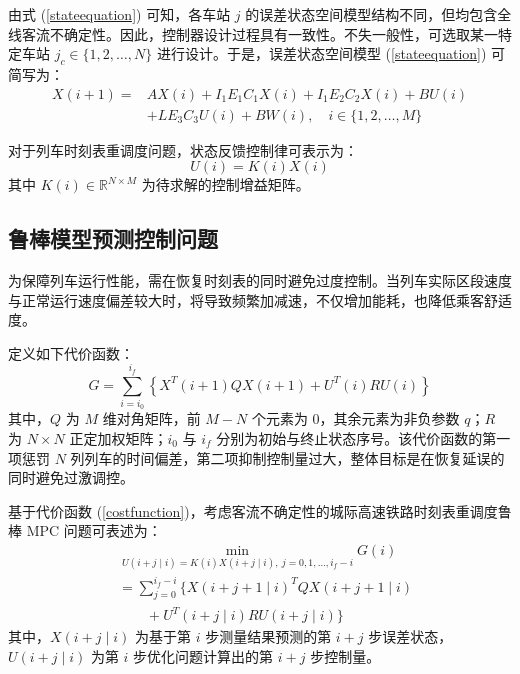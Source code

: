 由式 (\ref{stateequation}) 可知，各车站 $j$ 的误差状态空间模型结构不同，但均包含全线客流不确定性。因此，控制器设计过程具有一致性。不失一般性，可选取某一特定车站 $j_c \in \{1,2,\dots,N\}$ 进行设计。于是，误差状态空间模型 (\ref{stateequation}) 可简写为：
\begin{equation}
\label{model}
\begin{aligned}
X(i+1) ={}& A X(i) + I_{1} E_{1} C_{1} X(i) + I_{1} E_{2} C_{2} X(i) + B U(i) \\
& + L E_{3} C_{3} U(i) + B W(i), \quad i \in \{1,2, \ldots, M\}
\end{aligned}
\end{equation}

对于列车时刻表重调度问题，状态反馈控制律可表示为：
\begin{equation}
U(i) = K(i) X(i)
\end{equation}
其中 $K(i) \in \mathbb{R}^{N \times M}$ 为待求解的控制增益矩阵。

\subsection{鲁棒模型预测控制问题}
\label{2.D}

为保障列车运行性能，需在恢复时刻表的同时避免过度控制。当列车实际区段速度与正常运行速度偏差较大时，将导致频繁加减速，不仅增加能耗，也降低乘客舒适度。

定义如下代价函数：
\begin{equation}
G = \sum_{i=i_{0}}^{i_{f}} \left\{ X^{\!T}(i+1) Q X(i+1) + U^{\!T}(i) R U(i) \right\}
\end{equation}
其中，$Q$ 为 $M$ 维对角矩阵，前 $M-N$ 个元素为 0，其余元素为非负参数 $q$；$R$ 为 $N \times N$ 正定加权矩阵；$i_0$ 与 $i_f$ 分别为初始与终止状态序号。该代价函数的第一项惩罚 $N$ 列列车的时间偏差，第二项抑制控制量过大，整体目标是在恢复延误的同时避免过激调控。

基于代价函数 (\ref{costfunction})，考虑客流不确定性的城际高速铁路时刻表重调度鲁棒 MPC 问题可表述为：
\begin{equation}
	\label{costfunction}
	\begin{aligned}
		&\min_{U(i+j \mid i)=K(i) X(i+j \mid i),\ j=0,1,\dots,i_f-i} G(i) \\
		&= \sum_{j=0}^{i_f-i} \Big\{ X(i+j+1 \mid i)^{\!T} Q X(i+j+1 \mid i) \\
		&\qquad + U^{\!T}(i+j \mid i) R U(i+j \mid i) \Big\}
	\end{aligned}
\end{equation}
其中，$X(i+j \mid i)$ 为基于第 $i$ 步测量结果预测的第 $i+j$ 步误差状态，$U(i+j \mid i)$ 为第 $i$ 步优化问题计算出的第 $i+j$ 步控制量。

